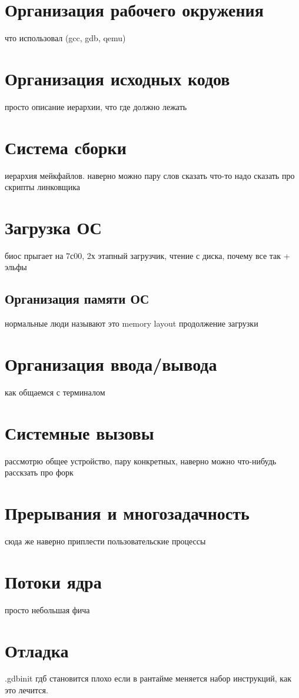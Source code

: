 

\section{Организация рабочего окружения}
что использовал (gcc, gdb, qemu)

\section{Организация исходных кодов}
просто описание иерархии, что где должно лежать

\section{Система сборки}
иерархия мейкфайлов. наверно можно пару слов сказать
что-то надо сказать про скрипты линковщика

\section{Загрузка ОС}
биос прыгает на 7с00, 2х этапный загрузчик, чтение с диска, почему все так + эльфы

\subsection{Организация памяти ОС}
нормальные люди называют это memory layout
продолжение загрузки

\section{Организация ввода/вывода}
как общаемся с терминалом

\section{Системные вызовы}
рассмотрю общее устройство, пару конкретных, наверно можно что-нибудь расскзать про форк

\section{Прерывания и многозадачность}
сюда же наверно приплести пользовательские процессы

\section{Потоки ядра}
просто небольшая фича

\section{Отладка}
.gdbinit
гдб становится плохо если в рантайме меняется набор инструкций, как это лечится.
